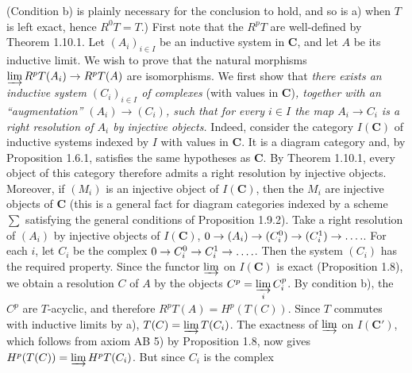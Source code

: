 (Condition b) is plainly necessary for the conclusion to hold, and so is a)
when $T$ is left exact, hence $R^0T=T$.) First note that the $R^pT$ are
well-defined by Theorem 1.10.1. Let $(A_i)_{i\in I}$ be an inductive system in
$\mathbf C$, and let $A$ be its inductive limit. We wish to prove that the natural
morphisms
$\varinjlim R^pT(A_i)\to R^pT(A)$
are isomorphisms.
We first show that \textit{there exists an inductive system $(C_i)_{i\in I}$ of
complexes} (with values in $\mathbf C$)\textit{, together with an ``augmentation''
$(A_i)\to(C_i)$, such that for every $i\in I$ the map
$A_i\to C_i$ is a right resolution of $A_i$ by injective objects.}
Indeed, consider the category $I(\mathbf C)$ of inductive systems indexed by $I$ with
values in $\mathbf C$. It is a diagram category and, by Proposition 1.6.1, satisfies
the same hypotheses as $\mathbf C$. By Theorem 1.10.1, every object of this category
therefore admits a right resolution by injective objects. Moreover, if $(M_i)$
is an injective object of $I(\mathbf C)$, then the $M_i$ are injective objects of $\mathbf C$
(this is a general fact for diagram categories indexed by a scheme $\displaystyle\sum$
satisfying the general conditions of Proposition 1.9.2). Take a right resolution of $(A_i)$ by injective objects of $I(\mathbf C)$,
$0\to(A_i)\to(C_i^0)\to(C_i^1)\to\mathinner{.\,.\,.\,.}$.
For each $i$, let $C_i$ be the complex
$0\to C_i^0\to C_i^1\to\mathinner{.\,.\,.\,.}$.
Then the system $(C_i)$ has the required property.
Since the functor $\varinjlim$ on $I(\mathbf C)$ is exact (Proposition 1.8), we obtain
a resolution $C$ of $A$ by the objects
$C^p=\varinjlim\limits_i C_i^p$.
By condition b), the $C^p$ are $T$-acyclic, and therefore
$R^pT(A)=H^p(T(C))$.
Since $T$ commutes with inductive limits by a),
$T(C)=\varinjlim T(C_i)$.
The exactness of $\varinjlim$ on $I(\mathbf C')$, which follows from axiom AB 5) by
Proposition 1.8, now gives
$H^p(T(C))=\varinjlim H^pT(C_i)$.
But since $C_i$ is the complex

